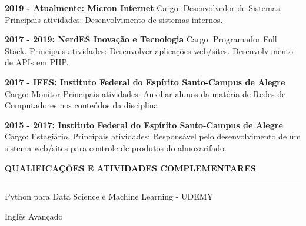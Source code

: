 \documentclass[a4paper,12pt]{article}
\begin{document}
\begin{itemize}
    \begin{item}
        \textbf{2019 - Atualmente: Micron Internet}
        \newline
        Cargo: Desenvolvedor de Sistemas.
        \newline
        Principais atividades: Desenvolvimento de sistemas internos.
    \end{item}

    \begin{item}
        \textbf{2017 - 2019: NerdES Inova\c{c}\~{a}o e Tecnologia}
        \newline
        Cargo: Programador Full Stack.
        \newline
        Principais atividades: Desenvolver aplica\c{c}\~{o}es web/sites. Desenvolvimento de APIs em PHP.
    \end{item}
    \begin{item}
        \textbf{2017 - IFES: Instituto Federal do Esp\'{i}rito Santo-Campus de Alegre}
        \newline
        Cargo: Monitor
       \newline
        Principais atividades: Auxiliar alunos da matéria de Redes de Computadores nos conteúdos da disciplina.
    \end{item}
    \begin{item}
        \textbf{2015 - 2017: Instituto Federal do Esp\'{i}rito Santo-Campus de Alegre}
        \newline
        Cargo: Estagi\'{a}rio.
       \newline
        Principais atividades: Respons\'{a}vel pelo desenvolvimento de um sistema web/sites para controle de produtos do almoxarifado.
    \end{item}
\end{itemize}
\newpage
\begin{flushleft}
\textbf{QUALIFICA\c{C}\~{O}ES E ATIVIDADES COMPLEMENTARES}
\noindent\textcolor{gray}{\rule{18cm}{1px}}
\end{flushleft}

\begin{itemize}
    \begin{item}
        Python para Data Science e Machine Learning - UDEMY
    \end{item}
    \begin{item}
        Ingl\^{e}s Avan\c{c}ado
    \end{item}
    \newline
\end{itemize}
    
\end{document}
